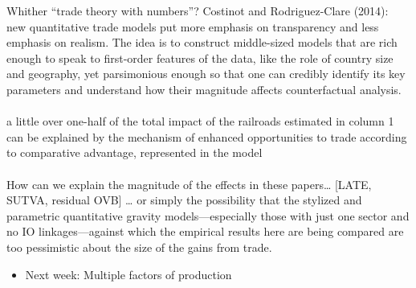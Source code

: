 \documentclass[10pt,notes=hide]{beamer}
\begin{document}
\begin{frame}{Whither ``trade theory with numbers''?}
Costinot and Rodriguez-Clare (2014): \\
{\footnotesize
new quantitative trade models put more emphasis on transparency and less emphasis on realism. The idea is to construct middle-sized models that are rich enough to speak to first-order features of the data, like the role of country size and geography, yet parsimonious enough so that one can credibly identify its key parameters and understand how their magnitude affects counterfactual analysis.} \\
 \\
{\footnotesize a little over one-half of the total impact of the railroads estimated in column 1 can be explained by the mechanism of enhanced opportunities to trade according to comparative advantage, represented in the model} \\
 \\
{\footnotesize How can we explain the magnitude of the effects in these papers\dots
[LATE, SUTVA, residual OVB]
\dots
or simply the possibility that the stylized and parametric quantitative gravity models—especially those with just one sector and no IO linkages—against which the empirical results here are being compared are too pessimistic about the size of the gains from trade.
}
\end{frame}
\begin{frame}[plain]
\begin{itemize}
	\item Next week: Multiple factors of production
\end{itemize}
\end{frame}
\end{document}
